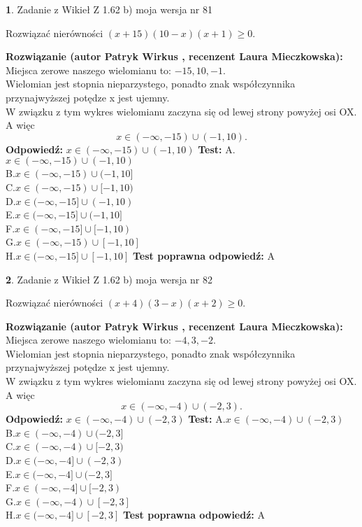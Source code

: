 \documentclass[12pt, a4paper]{article}
\theoremstyle{definition} %
\newtheorem{zad}{}
\newcommand{\zadStart}[1]{\begin{zad}#1\newline}
\newcommand{\zadStop}{\end{zad}}
\newcommand{\rozwStart}[2]{\noindent \textbf{Rozwiązanie (autor #1 , recenzent #2): }\newline}
\newcommand{\rozwStop}{\newline}
\newcommand{\odpStart}{\noindent \textbf{Odpowiedź:}\newline}
\newcommand{\odpStop}{\newline}
\newcommand{\testStart}{\noindent \textbf{Test:}\newline}
\newcommand{\testStop}{\newline}
\newcommand{\kluczStart}{\noindent \textbf{Test poprawna odpowiedź:}\newline}
\newcommand{\kluczStop}{\newline}
\begin{document}
\zadStart{Zadanie z Wikieł Z 1.62 b) moja wersja nr 81}

Rozwiązać nierówności $(x+15)(10-x)(x+1)\ge0$.
\zadStop
\rozwStart{Patryk Wirkus}{Laura Mieczkowska}
Miejsca zerowe naszego wielomianu to: $-15, 10, -1$.\\
Wielomian jest stopnia nieparzystego, ponadto znak współczynnika przy\linebreak najwyższej potędze x jest ujemny.\\ W związku z tym wykres wielomianu zaczyna się od lewej strony powyżej osi OX. A więc $$x \in (-\infty,-15) \cup (-1,10).$$
\rozwStop
\odpStart
$x \in (-\infty,-15) \cup (-1,10)$
\odpStop
\testStart
A.$x \in (-\infty,-15) \cup (-1,10)$\\
B.$x \in (-\infty,-15) \cup (-1,10]$\\
C.$x \in (-\infty,-15) \cup [-1,10)$\\
D.$x \in (-\infty,-15] \cup (-1,10)$\\
E.$x \in (-\infty,-15] \cup (-1,10]$\\
F.$x \in (-\infty,-15] \cup [-1,10)$\\
G.$x \in (-\infty,-15) \cup [-1,10]$\\
H.$x \in (-\infty,-15] \cup [-1,10]$
\testStop
\kluczStart
A
\kluczStop



\zadStart{Zadanie z Wikieł Z 1.62 b) moja wersja nr 82}

Rozwiązać nierówności $(x+4)(3-x)(x+2)\ge0$.
\zadStop
\rozwStart{Patryk Wirkus}{Laura Mieczkowska}
Miejsca zerowe naszego wielomianu to: $-4, 3, -2$.\\
Wielomian jest stopnia nieparzystego, ponadto znak współczynnika przy\linebreak najwyższej potędze x jest ujemny.\\ W związku z tym wykres wielomianu zaczyna się od lewej strony powyżej osi OX. A więc $$x \in (-\infty,-4) \cup (-2,3).$$
\rozwStop
\odpStart
$x \in (-\infty,-4) \cup (-2,3)$
\odpStop
\testStart
A.$x \in (-\infty,-4) \cup (-2,3)$\\
B.$x \in (-\infty,-4) \cup (-2,3]$\\
C.$x \in (-\infty,-4) \cup [-2,3)$\\
D.$x \in (-\infty,-4] \cup (-2,3)$\\
E.$x \in (-\infty,-4] \cup (-2,3]$\\
F.$x \in (-\infty,-4] \cup [-2,3)$\\
G.$x \in (-\infty,-4) \cup [-2,3]$\\
H.$x \in (-\infty,-4] \cup [-2,3]$
\testStop
\kluczStart
A
\kluczStop
\end{document}
